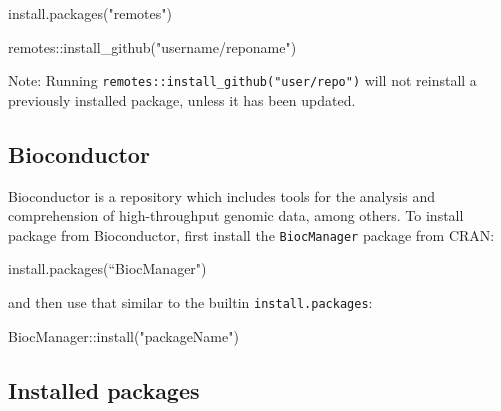 \documentclass[
]{book}
\newenvironment{Shaded}{\begin{snugshade}}{\end{snugshade}}
\newcommand{\FunctionTok}[1]{\textcolor[rgb]{0.00,0.00,0.00}{#1}}
\newcommand{\NormalTok}[1]{#1}
\newcommand{\SpecialCharTok}[1]{\textcolor[rgb]{0.00,0.00,0.00}{#1}}
\newcommand{\StringTok}[1]{\textcolor[rgb]{0.31,0.60,0.02}{#1}}
\begin{document}
\begin{Shaded}
\begin{Highlighting}[]
\FunctionTok{install.packages}\NormalTok{(}\StringTok{"remotes"}\NormalTok{)}
\end{Highlighting}
\end{Shaded}

\begin{Shaded}
\begin{Highlighting}[]
\NormalTok{remotes}\SpecialCharTok{::}\FunctionTok{install\_github}\NormalTok{(}\StringTok{"username/reponame"}\NormalTok{)}
\end{Highlighting}
\end{Shaded}

Note: Running \texttt{remotes::install\_github("user/repo")} will not reinstall a previously installed package, unless it has been updated.

\hypertarget{bioconductor}{%
\subsection{Bioconductor}\label{bioconductor}}

Bioconductor is a repository which includes tools for the analysis and comprehension of high-throughput genomic data, among others. To install package from Bioconductor, first install the \texttt{BiocManager} package from CRAN:

\begin{Shaded}
\begin{Highlighting}[]
\FunctionTok{install.packages}\NormalTok{(“BiocManager}\StringTok{")}
\end{Highlighting}
\end{Shaded}

and then use that similar to the builtin \texttt{install.packages}:

\begin{Shaded}
\begin{Highlighting}[]
\NormalTok{BiocManager}\SpecialCharTok{::}\FunctionTok{install}\NormalTok{(}\StringTok{"packageName"}\NormalTok{)}
\end{Highlighting}
\end{Shaded}

\hypertarget{installed-packages}{%
\subsection{Installed packages}\label{installed-packages}}
\end{document}
